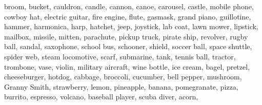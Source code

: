 \documentclass[10pt,twocolumn,letterpaper]{article}
\begin{document}
broom, \quad 
bucket, \quad 
cauldron, \quad 
candle, \quad 
cannon, \quad 
canoe, \quad 
carousel, \quad 
castle, \quad 
mobile phone, \quad 
cowboy hat, \quad 
electric guitar, \quad 
fire engine, \quad 
flute, \quad 
gasmask, \quad 
grand piano, \quad 
guillotine, \quad 
hammer, \quad 
harmonica, \quad 
harp, \quad 
hatchet, \quad 
jeep, \quad 
joystick, \quad 
lab coat, \quad 
lawn mower, \quad 
lipstick, \quad 
mailbox, \quad 
missile, \quad 
mitten, \quad 
parachute, \quad 
pickup truck, \quad 
pirate ship, \quad 
revolver, \quad 
rugby ball, \quad 
sandal, \quad 
saxophone, \quad 
school bus, \quad 
schooner, \quad 
shield, \quad 
soccer ball, \quad 
space shuttle, \quad 
spider web, \quad 
steam locomotive, \quad 
scarf, \quad 
submarine, \quad 
tank, \quad 
tennis ball, \quad 
tractor, \quad 
trombone, \quad 
vase, \quad 
violin, \quad 
military aircraft, \quad 
wine bottle, \quad 
ice cream, \quad 
bagel, \quad 
pretzel, \quad 
cheeseburger, \quad 
hotdog, \quad 
cabbage, \quad 
broccoli, \quad 
cucumber, \quad 
bell pepper, \quad 
mushroom, \quad 
Granny Smith, \quad 
strawberry, \quad 
lemon, \quad 
pineapple, \quad 
banana, \quad 
pomegranate, \quad 
pizza, \quad 
burrito, \quad 
espresso, \quad 
volcano, \quad 
baseball player, \quad 
scuba diver, \quad 
acorn, \quad 
\end{document}
